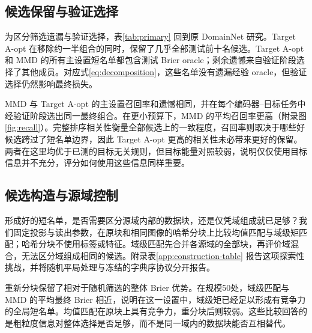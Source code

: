 \begin{table}[ht]
\centering
\caption{表中给出两种读出的配对最终 Brier 与平均核算时间，单位为秒。Resident 从内存中的投影特征开始，包含评分、拟合和验证。Images 在此基础上加入固定池清单的独立特征测量，是分项加总而非完整流水线重放。全部均值来自同一批计时选择。}
\label{tab:cost}

\end{table}

\subsection{候选保留与验证选择}
为区分筛选遗漏与验证选择，表\ref{tab:primary} 回到原 DomainNet 研究。Target A-opt 在移除约一半组合的同时，保留了几乎全部测试前十名候选。Target A-opt 和 MMD 的所有主设置短名单都包含测试 Brier oracle；剩余遗憾来自验证阶段选择了其他成员。对应式\eqref{eq:decomposition}，这些名单没有遗漏经验 oracle，但验证选择仍然影响最终损失。

\begin{table}[t]
\centering
\caption{原 DomainNet 实验从 455 个组合中保留 $s=227$ 个。均值先在六个目标域内平均编码器。召回率对应测试 Brier 前十名；遗憾相对于 oracle Brier；Spearman 衡量完整筛选排序与测试损失排序的一致性。}
\label{tab:primary}

\end{table}

MMD 与 Target A-opt 的主设置召回率和遗憾相同，并在每个编码器--目标任务中经验证阶段选出同一最终组合。在更小预算下，MMD 的平均召回率更高（附录图\ref{fig:recall}）。完整排序相关性衡量全部候选上的一致程度，召回率则取决于哪些好候选跨过了短名单边界，因此 Target A-opt 更高的相关性未必带来更好的保留。两者在这里均优于已测的目标无关规则，但目标能量对照较弱，说明仅仅使用目标信息并不充分，评分如何使用这些信息同样重要。

\subsection{候选构造与源域控制}
\label{sec:construction}
形成好的短名单，是否需要区分源域内部的数据块，还是仅凭域组成就已足够？我们固定投影与读出参数，在原块和相同图像的哈希分块上比较均值匹配与域级矩匹配；哈希分块不使用标签或特征。域级匹配先合并各源域的全部块，再评价域混合，无法区分域组成相同的候选。附录表\ref{app:construction-table} 报告这项探索性挑战，并将随机平局处理与冻结的字典序协议分开报告。

重新分块保留了相对于随机筛选的整体 Brier 优势。在规模50处，域级匹配与 MMD 的平均最终 Brier 相近，说明在这一设置中，域级矩已经足以形成有竞争力的全局短名单。均值匹配在原块上具有竞争力，重分块后则较弱。这些比较回答的是粗粒度信息对整体选择是否足够，而不是同一域内的数据块能否互相替代。

